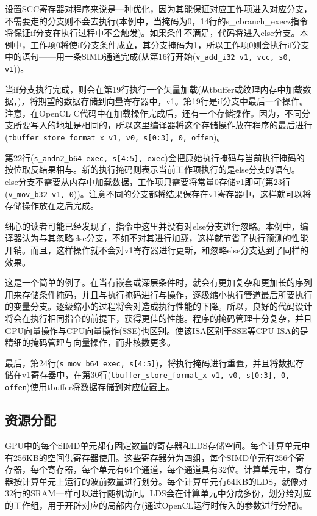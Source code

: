 设置SCC寄存器对程序来说是一种优化，因为其能保证对应工作项进入对应分支，不需要走的分支则不会去执行(本例中，当掩码为0，14行的s\_\allowbreak{}cbranch\_\allowbreak{}execz指令将保证if分支在执行过程中不会触发)。如果条件不满足，代码将进入else分支。本例中，工作项0将使if分支条件成立，其分支掩码为1，所以工作项0则会执行if分支中的语句——用一条SIMD通道完成(从第16行开始(\texttt{v\_add\_i32 v1, vcc, s0, v1}))。

当if分支执行完成，则会在第19行执行一个矢量加载(从tbuffer或纹理内存中加载数据，)，将期望的数据存储到向量寄存器中，v1。第19行是if分支中最后一个操作。注意，在OpenCL C代码中在加载操作完成后，还有一个存储操作。因为，不同分支所要写入的地址是相同的，所以这里编译器将这个存储操作放在程序的最后进行(\texttt{tbuffer\_store\_format\_x v1, v0, s[0:3], 0, offen})。

第22行(\texttt{s\_andn2\_b64 exec, s[4:5], exec})会把原始执行掩码与当前执行掩码的按位取反结果相与。新的执行掩码则表示当前工作项执行的是else分支的语句。else分支不需要从内存中加载数据，工作项只需要将常量0存储v1即可(第23行(\texttt{v\_mov\_b32 v1, 0}))。注意不同的分支都将结果保存在v1寄存器中，这样就可以将存储操作放在之后完成。

细心的读者可能已经发现了，指令中这里并没有对else分支进行忽略。本例中，编译器认为与其忽略else分支，不如不对其进行加载，这样就节省了执行预测的性能开销。而且，这样操作就不会对v1寄存器进行更新，和忽略else分支达到了同样的效果。

这是一个简单的例子。在当有嵌套或深层条件时，就会有更加复杂和更加长的序列用来存储条件掩码，并且与执行掩码进行与操作，逐级缩小执行管道最后所要执行的变量分支。逐级缩小的过程将会对造成执行性能的下降。所以，良好的代码设计将会在执行相同指令的前提下，获得更佳的性能。程序的掩码管理十分复杂，并且GPU向量操作与CPU向量操作(SSE)也区别。使该ISA区别于SSE等CPU ISA的是精细的掩码管理与向量操作，而非核数更多。

最后，第24行(\texttt{s\_mov\_b64 exec, s[4:5]})，将执行掩码进行重置，并且将数据存储在v1寄存器中，在第30行(\texttt{tbuffer\_store\_format\_x v1, v0, s[0:3], 0, offen})使用tbuffer将数据存储到对应位置上。

\subsection{资源分配}

GPU中的每个SIMD单元都有固定数量的寄存器和LDS存储空间。每个计算单元中有256KB的空间供寄存器使用。这些寄存器分为四组，每个SIMD单元有256个寄存器，每个寄存器，每个单元有64个通道，每个通道具有32位。计算单元中，寄存器按计算单元上运行的波前数量进行划分。每个计算单元有64KB的LDS，就像对32行的SRAM一样可以进行随机访问。LDS会在计算单元中分成多份，划分给对应的工作组，用于开辟对应的局部内存(通过OpenCL运行时传入的参数进行分配)。

